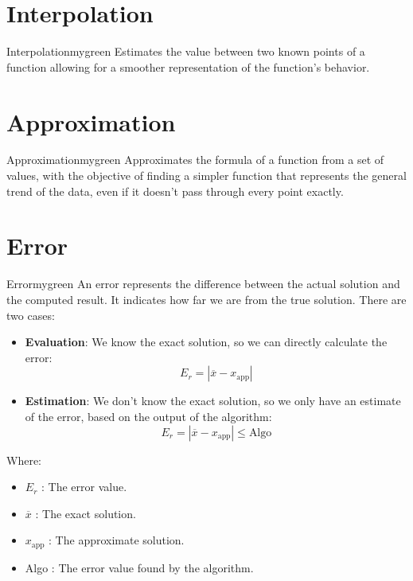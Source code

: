 \vspace{0.35cm}

\section{Interpolation}
\begin{prettyBox}{Interpolation}{mygreen}
Estimates the value between two known points of a function allowing for a smoother representation of the function's behavior.
\end{prettyBox}

\vspace{0.35cm}

\section{Approximation}
\begin{prettyBox}{Approximation}{mygreen}
Approximates the formula of a function from a set of values, with the objective of finding a simpler function that represents the general trend of the data, even if it doesn't pass through every point exactly.
\end{prettyBox}

\vspace{0.35cm}

\section{Error}
\begin{prettyBox}{Error}{mygreen}
An error represents the difference between the actual solution and the computed result. It indicates how far we are from the true solution. There are two cases:
\begin{itemize}
    \item \textbf{Evaluation}: We know the exact solution, so we can directly calculate the error:
        \[   \boxed{E_r = |\overline{x} - x_{\text{app}}|} \]
    \item \textbf{Estimation}: We don't know the exact solution, so we only have an estimate of the error, based on the output of the algorithm:
        \[      \boxed{E_r = |\overline{x} - x_{\text{app}}| \leq \text{Algo}} \]
\end{itemize}

Where:
\begin{itemize}
    \item \(E_r\) : The error value.
    \item \(\overline{x}\) : The exact solution.
    \item \(x_{\text{app}}\) : The approximate solution.
    \item Algo : The error value found by the algorithm.
\end{itemize}
\end{prettyBox}

